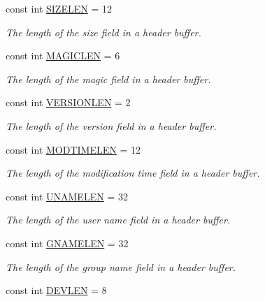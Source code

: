 \begin{DoxyCompactItemize}
const int \hyperlink{class_i_c_sharp_code_1_1_sharp_zip_lib_1_1_tar_1_1_tar_header_a6d61ab0b898f6199a640a9684706a189}{S\+I\+Z\+E\+L\+EN} = 12
\begin{DoxyCompactList}\small\item\em The length of the size field in a header buffer. \end{DoxyCompactList}\item 
const int \hyperlink{class_i_c_sharp_code_1_1_sharp_zip_lib_1_1_tar_1_1_tar_header_a1684edabe026512df59a1e20b7b0c3a3}{M\+A\+G\+I\+C\+L\+EN} = 6
\begin{DoxyCompactList}\small\item\em The length of the magic field in a header buffer. \end{DoxyCompactList}\item 
const int \hyperlink{class_i_c_sharp_code_1_1_sharp_zip_lib_1_1_tar_1_1_tar_header_a6f5901cdae8f0986dd88f10890a52018}{V\+E\+R\+S\+I\+O\+N\+L\+EN} = 2
\begin{DoxyCompactList}\small\item\em The length of the version field in a header buffer. \end{DoxyCompactList}\item 
const int \hyperlink{class_i_c_sharp_code_1_1_sharp_zip_lib_1_1_tar_1_1_tar_header_a06da491f2d11769e0ff6f5b25be270b8}{M\+O\+D\+T\+I\+M\+E\+L\+EN} = 12
\begin{DoxyCompactList}\small\item\em The length of the modification time field in a header buffer. \end{DoxyCompactList}\item 
const int \hyperlink{class_i_c_sharp_code_1_1_sharp_zip_lib_1_1_tar_1_1_tar_header_a070f91fd16aa0e102e671f8b859b6613}{U\+N\+A\+M\+E\+L\+EN} = 32
\begin{DoxyCompactList}\small\item\em The length of the user name field in a header buffer. \end{DoxyCompactList}\item 
const int \hyperlink{class_i_c_sharp_code_1_1_sharp_zip_lib_1_1_tar_1_1_tar_header_aa6529c8340dbd755d64b94eaee8399eb}{G\+N\+A\+M\+E\+L\+EN} = 32
\begin{DoxyCompactList}\small\item\em The length of the group name field in a header buffer. \end{DoxyCompactList}\item 
const int \hyperlink{class_i_c_sharp_code_1_1_sharp_zip_lib_1_1_tar_1_1_tar_header_ae1c4d72609165f94bf6d5603f53dfbe5}{D\+E\+V\+L\+EN} = 8

\end{DoxyCompactItemize}
